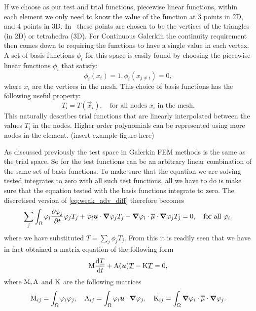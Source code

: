 If we choose \Pone as our test and trial functions, \ie piecewise linear
functions, within each element we only need to know the value 
of the function at 3 points in 2D, and 4 points in 3D. 
In \fluidity\ these points are chosen to be the vertices of 
the triangles (in 2D) or tetrahedra (3D). 
For Continuous Galerkin the continuity 
requirement then comes down to requiring 
the functions to have a single value in each
vertex. A set of basis functions $\phi_i$ 
for this space is easily found by choosing the piecewise linear functions
$\phi_i$ that satisfy:
\begin{equation*}
  \phi_i(x_i)=1, \phi_i(x_{j\neq i})=0,
\end{equation*}
where $x_i$ are the vertices in the mesh. 
This choice of basis functions has the following useful property:
\begin{equation*}
  T_i=T(\vec{x}_i),\quad \text{for all nodes $x_i$ in the mesh.}
\end{equation*}
This naturally describes trial functions that are linearly 
interpolated between the values $T_i$ in the nodes.
Higher order polynomials can be represented using more 
nodes in the element.
(insert \Ptwo example figure here)

As discussed previously the test space in Galerkin FEM methods is the same as the 
trial space. So for \PN the test functions can be an arbitrary linear combination 
of the same set of basis functions. To make sure that the equation we are solving 
tested integrates to zero with all such test functions, all we have to do is make sure
that the equation tested with the basis functions integrate to zero. The discretised 
version of \eqref{eq:weak_adv_diff} therefore becomes
\begin{equation}\label{eq:weak_adv_diff}
  \sum_j \int_\Omega \varphi_i \frac{\partial \varphi_j}{\partial t} \varphi_j T_j+ 
    \varphi_i{\mbox{\boldmath$u$}}\cdot{\mbox{\boldmath$\nabla$}} \varphi_j T_j - 
    {\mbox{\boldmath$\nabla$}}\varphi_i\cdot \overline{\overline{\mu}}\cdot{\mbox{\boldmath$\nabla$}} \varphi_j T_j = 0,
    \quad\text{for all }\varphi_i.
\end{equation}
where we have substituted $T=\sum_j \phi_j T_j$. From this it is readily seen that 
we have in fact obtained a matrix equation of the following form
\begin{equation*}
  \mathrm{M} \frac{\mathrm{d}\underline{T}}{\mathrm{d} t}+\mathrm{A}({\mbox{\boldmath$u$}})\underline{T}-\mathrm{K}\underline{T}=0,
  \label{eq:cg_adv_diff_mat}
\end{equation*}
where $\mathrm{M}, \mathrm{A}$ and $\mathrm{K}$ are the following matrices
\begin{equation*}
  \mathrm{M}_{ij}=\int_\Omega \varphi_i\varphi_j, \quad
  \mathrm{A}_{ij}=\int_\Omega \varphi_i{\mbox{\boldmath$u$}}\cdot{\mbox{\boldmath$\nabla$}} \varphi_j, \quad
  \mathrm{K}_{ij}=\int_\Omega {\mbox{\boldmath$\nabla$}}\varphi_i\cdot \overline{\overline{\mu}}\cdot{\mbox{\boldmath$\nabla$}} \varphi_j.
\end{equation*}

